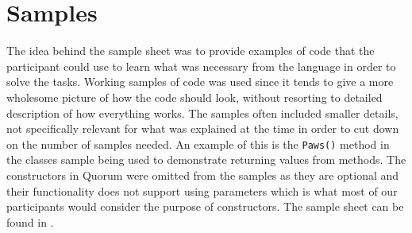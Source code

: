 \section{Samples}
The idea behind the sample sheet was to provide examples of code that the participant could use to learn what was necessary from the language in order to solve the tasks.
Working samples of code was used since it tends to give a more wholesome picture of how the code should look, without resorting to detailed description of how everything works.
The samples often included smaller details, not specifically relevant for what was explained at the time in order to cut down on the number of samples needed.
An example of this is the \lstinline!Paws()! method in the classes sample being used to demonstrate returning values from methods.
The constructors in Quorum were omitted from the samples as they are optional and their functionality does not support using parameters which is what most of our participants would consider the purpose of constructors.
The sample sheet can be found in .
